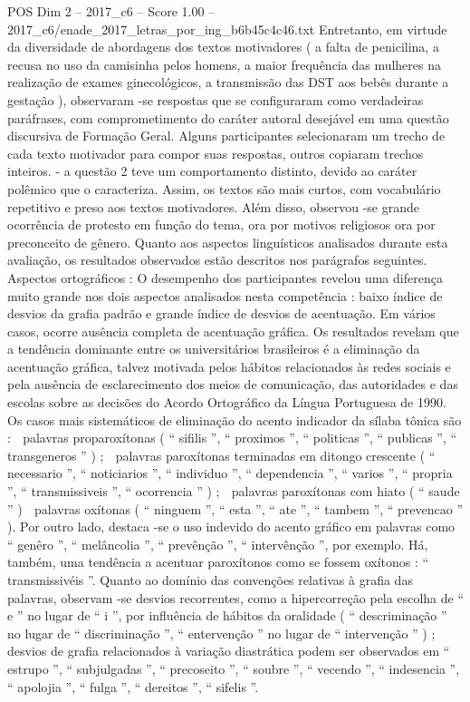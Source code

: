 \begin{textsample}{POS Dim 2 – 2017\_c6 – Score 1.00 – 2017\_c6/enade\_2017\_letras\_por\_ing\_b6b45c4c46.txt}
Entretanto, em virtude da diversidade de abordagens dos textos motivadores ( a falta de penicilina, a recusa no uso da camisinha pelos homens, a maior frequência das mulheres na realização de exames ginecológicos, a transmissão das DST aos bebês durante a gestação ), observaram -se respostas que se configuraram como verdadeiras paráfrases, com comprometimento do caráter autoral desejável em uma questão discursiva de Formação Geral.
Alguns participantes selecionaram um trecho de cada texto motivador para compor suas respostas, outros copiaram trechos inteiros. - a questão 2 teve um comportamento distinto, devido ao caráter polêmico que o caracteriza.
Assim, os textos são mais curtos, com vocabulário repetitivo e preso aos textos motivadores.
Além disso, observou -se grande ocorrência de protesto em função do tema, ora por motivos religiosos ora por preconceito de gênero.
Quanto aos aspectos linguísticos analisados durante esta avaliação, os resultados observados estão descritos nos parágrafos seguintes.
Aspectos ortográficos : O desempenho dos participantes revelou uma diferença muito grande nos dois aspectos analisados nesta competência : baixo índice de desvios da grafia padrão e grande índice de desvios de acentuação.
Em vários casos, ocorre ausência completa de acentuação gráfica.
Os resultados revelam que a tendência dominante entre os universitários brasileiros é a eliminação da acentuação gráfica, talvez motivada pelos hábitos relacionados às redes sociais e pela ausência de esclarecimento dos meios de comunicação, das autoridades e das escolas sobre as decisões do Acordo Ortográfico da Língua Portuguesa de 1990.
Os casos mais sistemáticos de eliminação do acento indicador da sílaba tônica são :  palavras proparoxítonas ( “ sifilis ”, “ proximos ”, “ politicas ”, “ publicas ”, “ transgeneros ” ) ;  palavras paroxítonas terminadas em ditongo crescente ( “ necessario ”, “ noticiarios ”, “ individuo ”, “ dependencia ”, “ varios ”, “ propria ”, “ transmissiveis ”, “ ocorrencia ” ) ;  palavras paroxítonas com hiato ( “ saude ” )  palavras oxítonas ( “ ninguem ”, “ esta ”, “ ate ”, “ tambem ”, “ prevencao ” ).
Por outro lado, destaca -se o uso indevido do acento gráfico em palavras como “ genêro ”, “ melâncolia ”, “ prevênção ”, “ intervênção ”, por exemplo.
Há, também, uma tendência a acentuar paroxítonos como se fossem oxítonos : “ transmissivéis ”.
Quanto ao domínio das convenções relativas à grafia das palavras, observam -se desvios recorrentes, como a hipercorreção pela escolha de “ e ” no lugar de “ i ”, por influência de hábitos da oralidade ( “ descriminação ” no lugar de “ discriminação ”, “ entervenção ” no lugar de “ intervenção ” ) ; desvios de grafia relacionados à variação diastrática podem ser observados em “ estrupo ”, “ subjulgadas ”, “ precoseito ”, “ soubre ”, “ vecendo ”, “ indesencia ”, “ apolojia ”, “ fulga ”, “ dereitos ”, “ sifelis ”.

\end{textsample}
